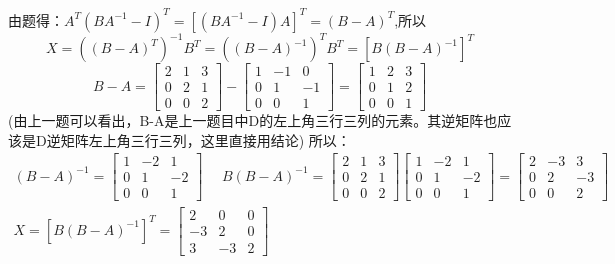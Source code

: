 \documentclass{article}
\begin{document}
\begin{jie}
由题得：$A^{T}(BA^{-1}-I)^{T}=[(BA^{-1}-I)A]^{T}=(B-A)^{T}$,所以
\begin{equation*}
  X=((B-A)^{T})^{-1}B^{T}=((B-A)^{-1})^{T}B^{T}=[B(B-A)^{-1}]^{T}
\end{equation*}
\begin{equation*}
  B-A=\begin{bmatrix}
  2 & 1 & 3 \\
  0 & 2 & 1\\
  0 & 0 & 2
\end{bmatrix}-\begin{bmatrix}
  1 & -1 & 0 \\
  0 & 1 & -1\\
  0 & 0 & 1
\end{bmatrix}=
\begin{bmatrix}
  1 & 2 & 3 \\
  0 & 1 & 2\\
  0 & 0 & 1
\end{bmatrix}
\end{equation*}
(\textcolor[rgb]{0.00,1.00,0.50}{由上一题可以看出，B-A是上一题目中D的左上角三行三列的元素。其逆矩阵也应该是D逆矩阵左上角三行三列，这里直接用结论})
所以：
\begin{gather*}
( B-A)^{-1}=\begin{bmatrix}
  1 & -2 & 1 \\
  0 & 1 & -2 \\
  0 & 0 & 1
\end{bmatrix}~~~~~~
B( B-A)^{-1}=\begin{bmatrix}
  2 & 1 & 3 \\
  0 & 2 & 1\\
  0 & 0 & 2
\end{bmatrix}\begin{bmatrix}
  1 & -2 & 1 \\
  0 & 1 & -2 \\
  0 & 0 & 1
\end{bmatrix}=
\begin{bmatrix}
  2 & -3 & 3 \\
  0 & 2 & -3 \\
  0 & 0 & 2
\end{bmatrix}\\
X=\left[B(B-A)^{-1}\right]^{T}=
\begin{bmatrix}
  2 & 0 & 0 \\
  -3 & 2 & 0\\
  3 & -3 & 2
\end{bmatrix}
\end{gather*}
\end{jie}
\end{document}
